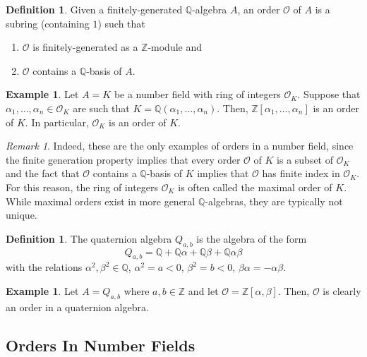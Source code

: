 \documentclass{amsart}
\theoremstyle{definition}
\newtheorem{definition}[thm]{Definition}
\newtheorem{example}[thm]{Example}
\theoremstyle{remark}
\newtheorem{remark}[thm]{Remark}
\numberwithin{equation}{section}
\newcommand{\cO}{\mathcal O}
\newcommand{\bbQ}{\mathbb Q}
\newcommand{\bbZ}{\mathbb Z}
\begin{document}
\begin{definition}
Given a finitely-generated $\bbQ$-algebra $A$, an order $\cO$ of $A$ is a subring (containing $1$) such that
\begin{enumerate}
\item $\cO$ is finitely-generated as a $\bbZ$-module and 
\item $\cO$ contains a $\bbQ$-basis of $A$.
\end{enumerate}
\end{definition}


\begin{example} \label{ex:OrdersInNumberField}
Let $A = K$ be a number field with ring of integers $\cO_{K}$.
 Suppose that $\alpha_1, \dots, \alpha_{n} \in \cO_{K}$ are such that $K = \bbQ(\alpha_1, \dots, \alpha_{n})$. Then, $\bbZ[\alpha_1,\dots, \alpha_{n}]$ is an order of $K$. In particular, $\cO_{K}$ is an order of $K$.
\end{example}

\begin{remark}
Indeed, these are the only examples of orders in a number field, since the finite generation property implies that every order $\cO$ of $K$ is a subset of $\cO_{K}$ and the fact that $\cO$ contains a $\bbQ$-basis of $K$ implies that $\cO$ has finite index in $\cO_{K}$. For this reason, the ring of integers $\cO_{K}$ is often called the maximal order of $K$. While maximal orders exist in more general $\bbQ$-algebras, 
they are typically not unique.
\end{remark}

\begin{definition} \label{def:QuaternionAlgebra}
The quaternion algebra $Q_{a,b}$ is the algebra of the form
 \[
 Q_{a,b} = \bbQ + \bbQ\alpha + \bbQ \beta + \bbQ \alpha \beta
 \]
 with the relations $\alpha^2, \beta^2 \in \bbQ$, $\alpha^2 = a < 0$, $\beta^2 = b < 0$, $\beta\alpha = -\alpha\beta$.
\end{definition}

\begin{example}
Let $A = Q_{a,b}$ where $a,b \in \bbZ$ and let $\cO = \bbZ[\alpha, \beta]$. Then, $\cO$ is clearly an order in a quaternion algebra.
\end{example}

\subsection{Orders In Number Fields}
\end{document}
